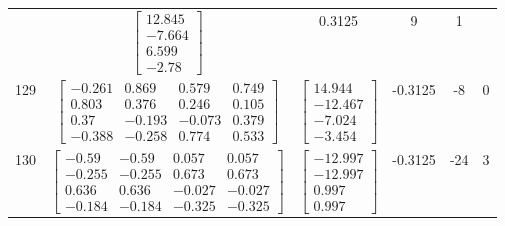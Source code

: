\documentclass[a4paper,12pt]{article}
\begin{document}
\begin{tabular}{c c c c c c}
&
$\begin{bmatrix} 12.845 \\ -7.664 \\ 6.599 \\ -2.78 \end{bmatrix}$
&
0.3125
&
9
&
1
\\
129
&
$\begin{bmatrix} -0.261 & 0.869 & 0.579 & 0.749 \\ 0.803 & 0.376 & 0.246 & 0.105 \\ 0.37 & -0.193 & -0.073 & 0.379 \\ -0.388 & -0.258 & 0.774 & 0.533 \end{bmatrix}$
&
$\begin{bmatrix} 14.944 \\ -12.467 \\ -7.024 \\ -3.454 \end{bmatrix}$
&
-0.3125
&
-8
&
0
\\
130
&
$\begin{bmatrix} -0.59 & -0.59 & 0.057 & 0.057 \\ -0.255 & -0.255 & 0.673 & 0.673 \\ 0.636 & 0.636 & -0.027 & -0.027 \\ -0.184 & -0.184 & -0.325 & -0.325 \end{bmatrix}$
&
$\begin{bmatrix} -12.997 \\ -12.997 \\ 0.997 \\ 0.997 \end{bmatrix}$
&
-0.3125
&
-24
&
3
\\
\end{tabular} \egroup \newpage
\end{document}

